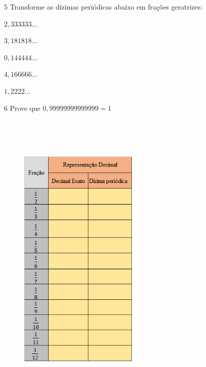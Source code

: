 \num{5} Transforme as dízimas periódicas abaixo em frações geratrizes:

\begin{escolha}
\item $2,333333...$
\item $3,181818...$
\item $0,144444...$
\item $4,166666...$
\item $1,2222...$
\end{escolha}


\num{6} Prove que $0,99999999999999 = 1$

\\
\\
\\


\begin{figure}[H]%
\centering\includegraphics[width=2.37378in,height=4.29167in]{./imgSAEB_8_MAT/media/image3.png}
\end{figure}

